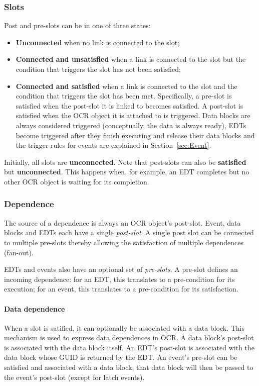 \subsubsection{Slots}
Post and pre-slots can be in one of three states:
\begin{itemize}
\item {\bf Unconnected} when no link is connected to the slot;
\item {\bf Connected and unsatisfied} when a link is connected to the
  slot but the condition that triggers the slot has not been
  satisfied;
\item {\bf Connected and satisfied}
  when a link is connected to the
  slot and the condition that triggers the slot has been
  met. Specifically, a pre-slot is satisfied when the post-slot it is
  linked to becomes satisfied. A post-slot is satisfied when the
  OCR object it is attached to is triggered. Data
  blocks are always considered triggered (conceptually, the data is
  always ready), EDTs become triggered after they finish executing and
  release their data blocks and the trigger rules for events are
  explained in Section~\ref{sec:Event}.
\end{itemize}
Initially, all slots are {\bf unconnected}. Note that post-slots can also
be {\bf satisfied} but {\bf unconnected}. This happens when, for
example, an EDT completes but no other OCR object is waiting for its completion.

\subsubsection{Dependence}
The source of a dependence is always an OCR object's post-slot.
Event, data blocks and EDTs each have a
single \emph{post-slot}. A single post slot can be connected
to multiple pre-slots thereby allowing the satisfaction of multiple
dependences (fan-out).

EDTs and events also have an optional set of
\emph{pre-slots}. A pre-slot defines an incoming
dependence: for an EDT, this translates to a pre-condition for its
execution; for an event, this translates to a pre-condition for its
satisfaction.
%
\paragraph{Data dependence}
When a slot is satified, it can optionally be associated with a data
block. This mechanism is used to express data dependences in OCR. A
data block's post-slot is associated with the data block itself. An
EDT's post-slot is associated with the data block whose GUID is
returned by the EDT. An event's pre-slot can be satisfied and
associated with a data block; that data block will then be passed to
the event's post-slot (except for latch events).

